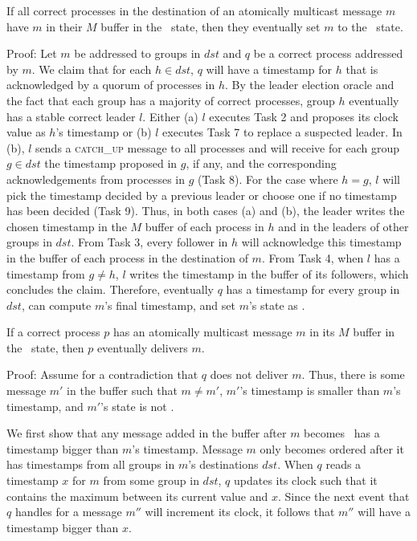 \vspace{2mm}
\begin{lemma}
If all correct processes in the destination of an atomically multicast message $m$ have $m$ in their $M$ buffer in the \mcast\ state, then they eventually set $m$ to the \ordered\ state.
\label{lemma:X}
\end{lemma}
\vspace{2mm}
\noindent
{\sc Proof:} 
Let $m$ be addressed to groups in $dst$ and $q$ be a correct process addressed by $m$.
We claim that for each $h \in dst$, $q $ will have a timestamp for $h$ that is acknowledged by a quorum of processes in $h$.
By the leader election oracle and the fact that each group has a majority of correct processes, group $h$ eventually has a stable correct leader $l$.
Either (a) $l$ executes Task 2 and proposes its clock value as $h$'s timestamp or (b) $l$ executes Task 7 to replace a suspected leader.
In (b), $l$ sends a \textsc{catch\_up} message to all processes and will receive for each group $g \in dst$ the timestamp proposed in $g$, if any, and the corresponding acknowledgements from processes in $g$ (Task 8).
For the case where $h=g$, $l$ will pick the timestamp decided by a previous leader or choose one if no timestamp has been decided (Task 9).
Thus, in both cases (a) and (b), the leader writes the chosen timestamp in the $M$ buffer of each process in $h$ and in the leaders of other groups in $dst$.
From Task 3, every follower in $h$ will acknowledge this timestamp in the buffer of each process in the destination of $m$.
From Task 4, when $l$ has a timestamp from $g \neq h$, $l$ writes the timestamp in the buffer of its followers, which concludes the claim.
Therefore, eventually $q$ has a timestamp for every group in $dst$, can compute $m$'s final timestamp, and set $m$'s state as \ordered.

\pagebreak
\begin{lemma}
If a correct process $p$ has an atomically multicast message $m$ in its $M$ buffer in the \ordered\ state, then $p$ eventually delivers $m$.
\label{lemma:Z}
\end{lemma}
\vspace{2mm}
\noindent
{\sc Proof:} 
Assume for a contradiction that $q$ does not deliver $m$.
Thus, there is some message $m'$ in the buffer such that $m \neq m'$, $m'$'s timestamp is smaller than $m$'s timestamp, and $m'$'s state is not \done.

We first show that any message added in the buffer after $m$ becomes \ordered\ has a timestamp bigger than $m$'s timestamp.
Message $m$ only becomes ordered after it has timestamps from all groups in $m$'s destinations $dst$.
When $q$ reads a timestamp $x$ for $m$ from some group in $dst$, $q$ updates its clock such that it contains the maximum between its current value and $x$.
Since the next event that $q$ handles for a message $m''$ will increment its clock, it follows that $m''$ will have a timestamp bigger than $x$.

